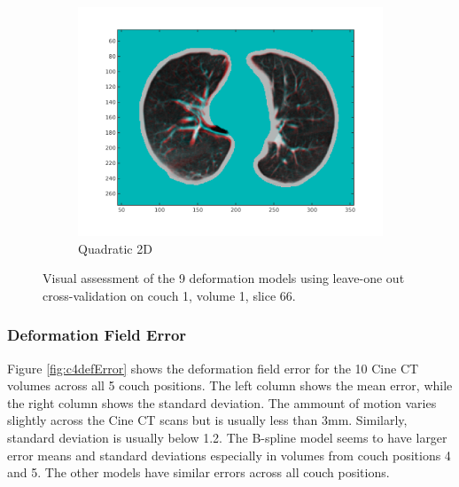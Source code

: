 \documentclass[11pt,a4paper,oneside]{report}
\begin{document}
\begin{figure}[H]
\begin{subfigure}[b]{0.33\textwidth}
    \includegraphics[width=\textwidth, trim=0 50 0 0,clip=true]{figures/task4/visAss_m9.png}
    \caption{Quadratic 2D}
  \end{subfigure}

    \caption{Visual assessment of the 9 deformation models using leave-one out cross-validation on couch 1, volume 1, slice 66. }
  \label{fig:c4visAss}
  
\end{figure}

\subsubsection*{Deformation Field Error}

Figure \ref{fig:c4defError} shows the deformation field error for the 10 Cine CT volumes across all 5 couch positions. The left column shows the mean error, while the right column shows the standard deviation. The ammount of motion varies slightly across the Cine CT scans but is usually less than 3mm. Similarly, standard deviation is usually below 1.2. The B-spline model seems to have larger error means and standard deviations especially in volumes from couch positions 4 and 5. The other models have similar errors across all couch positions.

\newcommand{\trimval}{140}
\newcommand{\trimvalleg}{140}
\end{document}
